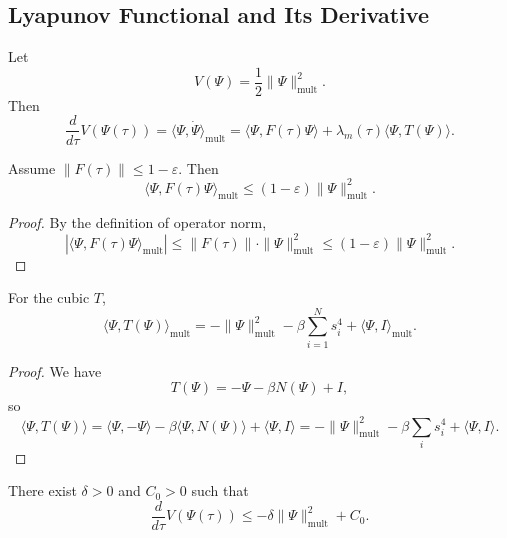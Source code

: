 \documentclass[11pt]{article}
\begin{document}
\subsection{Lyapunov Functional and Its Derivative}

Let
\[
V(\Psi) = \frac12 \|\Psi\|_{\mathrm{mult}}^2.
\]
Then
\[
\frac{d}{d\tau}V(\Psi(\tau))
= \big\langle \Psi, \dot{\Psi}\big\rangle_{\mathrm{mult}}
= \langle\Psi, F(\tau)\Psi\rangle + \lambda_m(\tau)\langle\Psi,T(\Psi)\rangle.
\]

\begin{lemma}
\label{lem:linear-contrib}
Assume \(\|F(\tau)\|\le 1-\varepsilon\).
Then
\[
\langle\Psi,F(\tau)\Psi\rangle_{\mathrm{mult}}
\le (1-\varepsilon)\|\Psi\|_{\mathrm{mult}}^2.
\]
\end{lemma}

\begin{proof}
By the definition of operator norm,
\[
|\langle\Psi,F(\tau)\Psi\rangle_{\mathrm{mult}}|
\le \|F(\tau)\|\cdot\|\Psi\|_{\mathrm{mult}}^2
\le (1-\varepsilon)\|\Psi\|_{\mathrm{mult}}^2.
\]
\end{proof}

\begin{lemma}
\label{lem:nonlinear-contrib}
For the cubic \(T\),
\[
\langle\Psi,T(\Psi)\rangle_{\mathrm{mult}}
= -\|\Psi\|_{\mathrm{mult}}^2 - \beta \sum_{i=1}^N s_i^4 + \langle\Psi,I\rangle_{\mathrm{mult}}.
\]
\end{lemma}

\begin{proof}
We have
\[
T(\Psi) = -\Psi - \beta N(\Psi) + I,
\]
so
\[
\langle\Psi,T(\Psi)\rangle
= \langle\Psi,-\Psi\rangle - \beta\langle\Psi,N(\Psi)\rangle + \langle\Psi,I\rangle
= -\|\Psi\|_{\mathrm{mult}}^2 - \beta \sum_i s_i^4 + \langle\Psi,I\rangle.
\]
\end{proof}

\begin{lemma}
\label{lem:dissipative-ineq}
There exist \(\delta>0\) and \(C_0>0\) such that
\[
\frac{d}{d\tau}V(\Psi(\tau)) \le -\delta \|\Psi\|_{\mathrm{mult}}^2 + C_0.
\]
\end{lemma}
\end{document}
